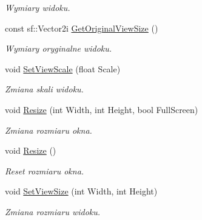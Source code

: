 \begin{DoxyCompactItemize}
\begin{DoxyCompactList}\small\item\em Wymiary widoku. \end{DoxyCompactList}\item 
\mbox{\label{classtfp_1_1_screen_ab6ba51ac1063ed7b9cab2195065887f2}} 
const sf\+::\+Vector2i \mbox{\hyperlink{classtfp_1_1_screen_ab6ba51ac1063ed7b9cab2195065887f2}{Get\+Original\+View\+Size}} ()
\begin{DoxyCompactList}\small\item\em Wymiary oryginalne widoku. \end{DoxyCompactList}\item 
\mbox{\label{classtfp_1_1_screen_a19f350b2ef7e30842d2d582976034215}} 
void \mbox{\hyperlink{classtfp_1_1_screen_a19f350b2ef7e30842d2d582976034215}{Set\+View\+Scale}} (float Scale)
\begin{DoxyCompactList}\small\item\em Zmiana skali widoku. \end{DoxyCompactList}\item 
\mbox{\label{classtfp_1_1_screen_a064c5c3f3d83d229a9d66df1c9bd1054}} 
void \mbox{\hyperlink{classtfp_1_1_screen_a064c5c3f3d83d229a9d66df1c9bd1054}{Resize}} (int Width, int Height, bool Full\+Screen)
\begin{DoxyCompactList}\small\item\em Zmiana rozmiaru okna. \end{DoxyCompactList}\item 
\mbox{\label{classtfp_1_1_screen_ab432ae70eebd86b018d9d1d21cf3abb2}} 
void \mbox{\hyperlink{classtfp_1_1_screen_ab432ae70eebd86b018d9d1d21cf3abb2}{Resize}} ()
\begin{DoxyCompactList}\small\item\em Reset rozmiaru okna. \end{DoxyCompactList}\item 
\mbox{\label{classtfp_1_1_screen_ad9257fe04dff4799034d400139d551fb}} 
void \mbox{\hyperlink{classtfp_1_1_screen_ad9257fe04dff4799034d400139d551fb}{Set\+View\+Size}} (int Width, int Height)
\begin{DoxyCompactList}\small\item\em Zmiana rozmiaru widoku. \end{DoxyCompactList}\item 

\end{DoxyCompactItemize}
